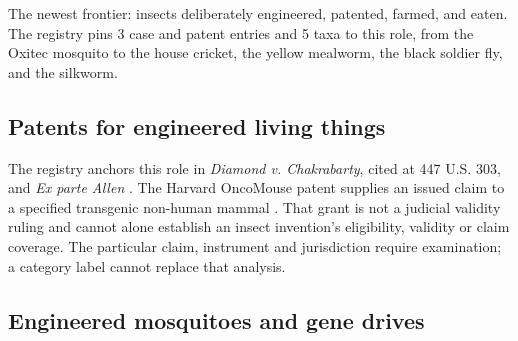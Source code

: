 \documentclass[
  english,
]{article}
\begin{document}
The newest frontier: insects deliberately engineered, patented, farmed,
and eaten. The registry pins 3 case and patent entries and 5 taxa to
this role, from the Oxitec mosquito to the house cricket, the yellow
mealworm, the black soldier fly, and the silkworm.

\subsection{Patents for engineered living
things}\label{patents-for-engineered-living-things}

The registry anchors this role in \emph{Diamond v. Chakrabarty}, cited
at 447 U.S. 303, and \emph{Ex parte Allen}
\citep{chakrabarty1980, exparteallen1987}. The Harvard OncoMouse patent
supplies an issued claim to a specified transgenic non-human mammal
\citep{depth_oncomouse}. That grant is not a judicial validity ruling
and cannot alone establish an insect invention's eligibility, validity
or claim coverage. The particular claim, instrument and jurisdiction
require examination; a category label cannot replace that analysis.

\subsection{Engineered mosquitoes and gene
drives}\label{engineered-mosquitoes-and-gene-drives}
\end{document}
